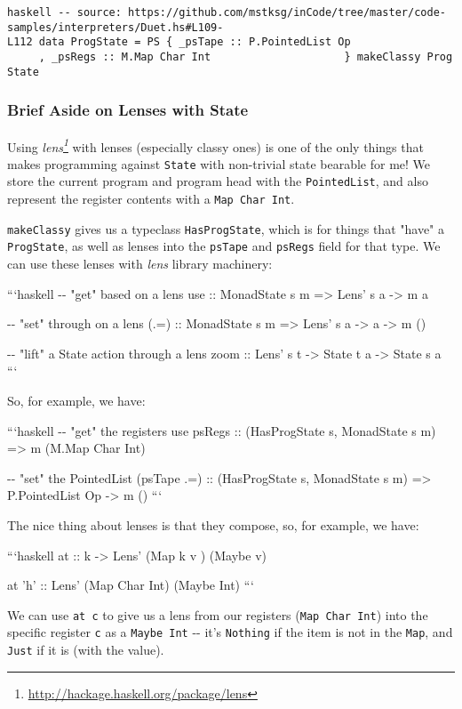 \documentclass[]{article}
\renewcommand{\href}[2]{#2\footnote{\url{#1}}}
\begin{document}
\texttt{haskell\ -\/-\ source:\ https://github.com/mstksg/inCode/tree/master/code-samples/interpreters/Duet.hs\#L109-L112\ data\ ProgState\ =\ PS\ \{\ \_psTape\ ::\ P.PointedList\ Op\ \ \ \ \ \ \ \ \ \ \ \ \ \ \ \ \ \ \ \ \ ,\ \_psRegs\ ::\ M.Map\ Char\ Int\ \ \ \ \ \ \ \ \ \ \ \ \ \ \ \ \ \ \ \ \ \}\ makeClassy\ \textquotesingle{}\textquotesingle{}ProgState}

\subsubsection{Brief Aside on Lenses with State}

Using \emph{\href{http://hackage.haskell.org/package/lens}{lens}} with lenses
(especially classy ones) is one of the only things that makes programming
against \texttt{State} with non-trivial state bearable for me! We store the
current program and program head with the \texttt{PointedList}, and also
represent the register contents with a \texttt{Map\ Char\ Int}.

\texttt{makeClassy} gives us a typeclass \texttt{HasProgState}, which is for
things that "have" a \texttt{ProgState}, as well as lenses into the
\texttt{psTape} and \texttt{psRegs} field for that type. We can use these lenses
with \emph{lens} library machinery:

```haskell -\/- \textbar{} "get" based on a lens use :: MonadState s m
=\textgreater{} Lens' s a -\textgreater{} m a

-\/- \textbar{} "set" through on a lens (.=) :: MonadState s m =\textgreater{}
Lens' s a -\textgreater{} a -\textgreater{} m ()

-\/- \textbar{} "lift" a State action through a lens zoom :: Lens' s t
-\textgreater{} State t a -\textgreater{} State s a ```

So, for example, we have:

```haskell -\/- \textbar{} "get" the registers use psRegs :: (HasProgState s,
MonadState s m) =\textgreater{} m (M.Map Char Int)

-\/- \textbar{} "set" the PointedList (psTape .=) :: (HasProgState s, MonadState
s m) =\textgreater{} P.PointedList Op -\textgreater{} m () ```

The nice thing about lenses is that they compose, so, for example, we have:

```haskell at :: k -\textgreater{} Lens' (Map k v ) (Maybe v)

at 'h' :: Lens' (Map Char Int) (Maybe Int) ```

We can use \texttt{at\ \textquotesingle{}c\textquotesingle{}} to give us a lens
from our registers (\texttt{Map\ Char\ Int}) into the specific register
\texttt{\textquotesingle{}c\textquotesingle{}} as a \texttt{Maybe\ Int} -\/-
it's \texttt{Nothing} if the item is not in the \texttt{Map}, and \texttt{Just}
if it is (with the value).
\end{document}
